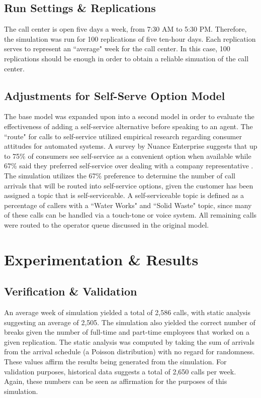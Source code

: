 \documentclass[12pt,twocolumn]{article}
\begin{document}
	\subsection{Run Settings \& Replications}
	
	 The call center is open five days a week, from 7:30 AM to 5:30 PM.  Therefore, the simulation was run for 100 replications of five ten-hour days.  Each replication serves to represent an ``average" week for the call center.  In this case, 100 replications should be enough in order to obtain a reliable simuation of the call center.
	 
	 
	\subsection{Adjustments for Self-Serve Option Model}
	
	The base model was expanded upon into a second model in order to evaluate the effectiveness of adding a self-service alternative before speaking to an agent.  The ``route" for calls to self-service utilized empirical research regarding consumer attitudes for automated systems.  A survey by Nuance Enterprise suggests that up to 75\% of consumers see self-service as a convenient option when available while 67\% said they preferred self-service over dealing with a company representative \cite{webblog}.  The simulation utilizes the 67\% preference to determine the number of call arrivals that will be routed into self-service options, given the customer has been assigned a topic that is self-serviceable.  A self-serviceable topic is defined as a percentage of callers with a ``Water Works" and ``Solid Waste" topic, since many of these calls can be handled via a touch-tone or voice system.  All remaining calls were routed to the operator queue discussed in the original model.

\section{Experimentation \& Results}

	\subsection{Verification \& Validation}
	
	  An average week of simulation yielded a total of 2,586 calls, with static analysis suggesting an average of 2,505.  The simulation also yielded the correct number of breaks given the number of full-time and part-time employees that worked on a given replication.  The static analysis was computed by taking the sum of arrivals from the arrival schedule (a Poisson distribution) with no regard for randomness.  These values affirm the results being generated from the simulation.  For validation purposes, historical data suggests a total of 2,650 calls per week.  Again, these numbers can be seen as affirmation for the purposes of this simulation.
	  
\end{document}
